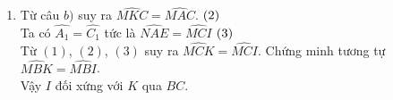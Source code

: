 \begin{bt}
{\begin{enumerate}
{\\
				\centering\textbf{Hình $379$}
			}
			\item Từ câu $b)$ suy ra  $\widehat{MKC}=\widehat{MAC}$. $\hfill (2)$\\
			Ta có $\widehat{A_1}=\widehat{C_1}$ tức là  $\widehat{NAE}=\widehat{MCI}$ $\hfill(3)$\\
			Từ $(1)$, $(2)$, $(3)$ suy ra  $\widehat{MCK}=\widehat{MCI}$. Chứng minh tương tự  $\widehat{MBK}=\widehat{MBI}$.\\
			Vậy $I$ đối xứng với $K$ qua $BC$. 
		\end{enumerate}	
	}
\end{bt}
